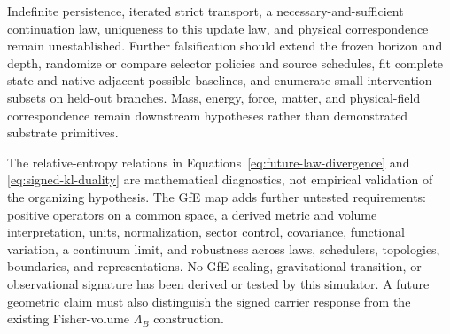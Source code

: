 Indefinite persistence, iterated strict transport, a necessary-and-sufficient
continuation law, uniqueness to this update law, and physical correspondence
remain unestablished. Further falsification should extend the frozen horizon and
depth, randomize or compare selector policies and source schedules, fit complete
state and native adjacent-possible baselines, and enumerate small intervention
subsets on held-out branches. Mass, energy, force, matter, and physical-field
correspondence remain downstream hypotheses rather than demonstrated substrate
primitives.

The relative-entropy relations in
Equations~\ref{eq:future-law-divergence} and \ref{eq:signed-kl-duality} are
mathematical diagnostics, not empirical validation of the organizing
hypothesis. The GfE map adds further untested requirements: positive operators
on a common space, a derived metric and volume interpretation, units,
normalization, sector control, covariance, functional variation, a continuum
limit, and robustness across laws, schedulers, topologies, boundaries, and
representations. No GfE scaling, gravitational transition, or observational
signature has been derived or tested by this simulator. A future geometric
claim must also distinguish the signed carrier response from the existing
Fisher-volume $\Lambda_B$ construction.
